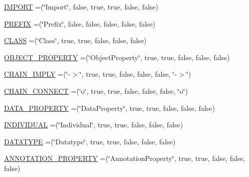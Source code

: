\begin{DoxyCompactItemize}
\item 
\hyperlink{enumorg_1_1coode_1_1owlapi_1_1manchesterowlsyntax_1_1_manchester_o_w_l_syntax_a548253879cbf013468e66683897cd6d7}{I\-M\-P\-O\-R\-T} =(\char`\"{}Import\char`\"{}, false, true, true, false, false)
\item 
\hyperlink{enumorg_1_1coode_1_1owlapi_1_1manchesterowlsyntax_1_1_manchester_o_w_l_syntax_a0fa9797699d2469ecbed50d0eea9dcef}{P\-R\-E\-F\-I\-X} =(\char`\"{}Prefix\char`\"{}, false, false, false, false, false)
\item 
\hyperlink{enumorg_1_1coode_1_1owlapi_1_1manchesterowlsyntax_1_1_manchester_o_w_l_syntax_a3c7a2f2a3d0803c8372b18ea8061badf}{C\-L\-A\-S\-S} =(\char`\"{}Class\char`\"{}, true, true, false, false, false)
\item 
\hyperlink{enumorg_1_1coode_1_1owlapi_1_1manchesterowlsyntax_1_1_manchester_o_w_l_syntax_afcf09383c78678ecedad3eba73f4b510}{O\-B\-J\-E\-C\-T\-\_\-\-P\-R\-O\-P\-E\-R\-T\-Y} =(\char`\"{}Object\-Property\char`\"{}, true, true, false, false, false)
\item 
\hyperlink{enumorg_1_1coode_1_1owlapi_1_1manchesterowlsyntax_1_1_manchester_o_w_l_syntax_a5ebc234887bee7ba08feb2bd1225dd35}{C\-H\-A\-I\-N\-\_\-\-I\-M\-P\-L\-Y} =(\char`\"{}-\/$>$\char`\"{}, true, true, false, false, false, \char`\"{}-\/$>$\char`\"{})
\item 
\hyperlink{enumorg_1_1coode_1_1owlapi_1_1manchesterowlsyntax_1_1_manchester_o_w_l_syntax_a97db2409d9fe79e9676577d940abd034}{C\-H\-A\-I\-N\-\_\-\-C\-O\-N\-N\-E\-C\-T} =(\char`\"{}o\char`\"{}, true, true, false, false, false, \char`\"{}o\char`\"{})
\item 
\hyperlink{enumorg_1_1coode_1_1owlapi_1_1manchesterowlsyntax_1_1_manchester_o_w_l_syntax_accc0ed99014d1023a5d34055dfea1906}{D\-A\-T\-A\-\_\-\-P\-R\-O\-P\-E\-R\-T\-Y} =(\char`\"{}Data\-Property\char`\"{}, true, true, false, false, false)
\item 
\hyperlink{enumorg_1_1coode_1_1owlapi_1_1manchesterowlsyntax_1_1_manchester_o_w_l_syntax_a3ede6e3249a68d4e571ce15de829834b}{I\-N\-D\-I\-V\-I\-D\-U\-A\-L} =(\char`\"{}Individual\char`\"{}, true, true, false, false, false)
\item 
\hyperlink{enumorg_1_1coode_1_1owlapi_1_1manchesterowlsyntax_1_1_manchester_o_w_l_syntax_af2e551395c3f5bc5b55e8bb4b756627b}{D\-A\-T\-A\-T\-Y\-P\-E} =(\char`\"{}Datatype\char`\"{}, true, true, false, false, false)
\item 
\hyperlink{enumorg_1_1coode_1_1owlapi_1_1manchesterowlsyntax_1_1_manchester_o_w_l_syntax_a0a85b31c00039fdf0672001115830af5}{A\-N\-N\-O\-T\-A\-T\-I\-O\-N\-\_\-\-P\-R\-O\-P\-E\-R\-T\-Y} =(\char`\"{}Annotation\-Property\char`\"{}, true, true, false, false, false)

\end{DoxyCompactItemize}
